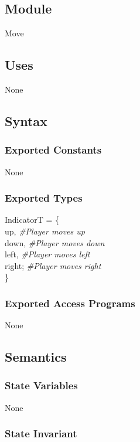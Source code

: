 \documentclass[12pt]{article}
\begin{document}
\subsection*{Module}

Move

\subsection* {Uses}

None

\subsection* {Syntax}

\subsubsection* {Exported Constants}

None

\subsubsection* {Exported Types}

IndicatorT = \{\\
    up, \textit{\#Player moves up}\\
    down, \textit{\#Player moves down}\\
    left, \textit{\#Player moves left}\\
    right; \textit{\#Player moves right}\\
\}

\subsubsection* {Exported Access Programs}

None

\subsection* {Semantics}

\subsubsection* {State Variables}

None

\subsubsection* {State Invariant}
\end{document}

